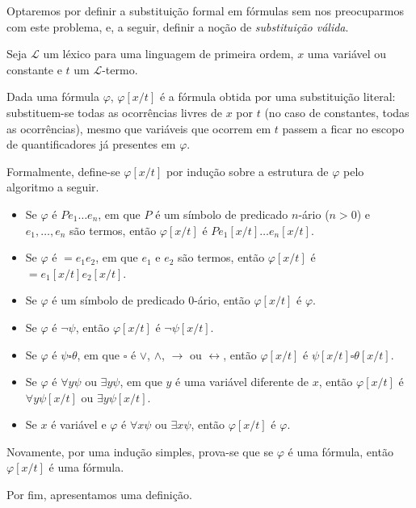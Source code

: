 Optaremos por definir a substituição formal em fórmulas sem nos preocuparmos com este problema, e, a seguir, definir a noção de \emph{substituição válida}.
\begin{metadefinition}\label{mdef:substituicaoEmFormulas}
    Seja $\mathcal L$ um léxico para uma linguagem de primeira ordem, $x$ uma variável ou constante e $t$ um $\mathcal L$-termo.

    Dada uma fórmula $\varphi$, $\varphi[x/t]$ é a fórmula obtida por uma substituição literal: substituem-se todas as ocorrências livres de $x$ por $t$ (no caso de constantes, todas as ocorrências), mesmo que variáveis que ocorrem em $t$ passem a ficar no escopo de quantificadores já presentes em $\varphi$.
    
    Formalmente, define-se $\varphi[x/t]$ por indução sobre a estrutura de $\varphi$ pelo algoritmo a seguir.
    \begin{itemize}
        \item Se $\varphi$ é $P e_1 \dots e_n$, em que $P$ é um símbolo de predicado $n$-ário ($n>0$) e $e_1, \dots, e_n$ são termos, então $\varphi[x/t]$ é $P e_1[x/t] \dots e_n[x/t]$.
        \item Se $\varphi$ é $= e_1 e_2$, em que $e_1$ e $e_2$ são termos, então $\varphi[x/t]$ é $= e_1[x/t] e_2[x/t]$.
        \item Se $\varphi$ é um símbolo de predicado 0-ário, então $\varphi[x/t]$ é $\varphi$.
        \item Se $\varphi$ é $\neg \psi$, então $\varphi[x/t]$ é $\neg \psi[x/t]$.
        \item Se $\varphi$ é $\psi \square \theta$, em que $\square$ é $\vee$, $\wedge$, $\rightarrow$ ou $\leftrightarrow$, então $\varphi[x/t]$ é $\psi[x/t] \square \theta[x/t]$.
        \item Se $\varphi$ é $\forall y \psi$ ou $\exists y \psi$, em que $y$ é uma variável diferente de $x$, então $\varphi[x/t]$ é $\forall y \psi[x/t]$ ou $\exists y \psi[x/t]$.
        \item Se $x$ é variável e $\varphi$ é $\forall x \psi$ ou $\exists x \psi$, então $\varphi[x/t]$ é $\varphi$.
    \end{itemize}
\end{metadefinition}

Novamente, por uma indução simples, prova-se que se $\varphi$ é uma fórmula, então $\varphi[x/t]$ é uma fórmula.

Por fim, apresentamos uma definição.

